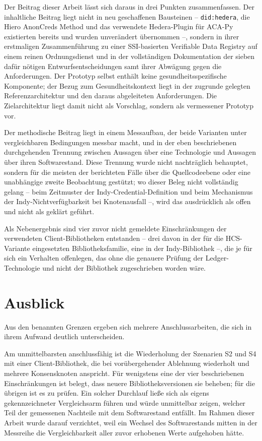Der Beitrag dieser Arbeit lässt sich daraus in drei Punkten zusammenfassen. Der inhaltliche Beitrag liegt nicht in neu geschaffenen Bausteinen -- \texttt{did:hedera}, die Hiero AnonCreds Method und das verwendete Hedera-Plugin für ACA-Py existierten bereits und wurden unverändert übernommen --, sondern in ihrer erstmaligen Zusammenführung zu einer SSI-basierten Verifiable Data Registry auf einem reinen Ordnungsdienst und in der vollständigen Dokumentation der sieben dafür nötigen Entwurfsentscheidungen samt ihrer Abwägung gegen die Anforderungen. Der Prototyp selbst enthält keine gesundheitsspezifische Komponente; der Bezug zum Gesundheitskontext liegt in der zugrunde gelegten Referenzarchitektur und den daraus abgeleiteten Anforderungen. Die Zielarchitektur liegt damit nicht als Vorschlag, sondern als vermessener Prototyp vor.

Der methodische Beitrag liegt in einem Messaufbau, der beide Varianten unter vergleichbaren Bedingungen messbar macht, und in der eben beschriebenen durchgehenden Trennung zwischen Aussagen über eine Technologie und Aussagen über ihren Softwarestand. Diese Trennung wurde nicht nachträglich behauptet, sondern für die meisten der berichteten Fälle über die Quellcodeebene oder eine unabhängige zweite Beobachtung gestützt; wo dieser Beleg nicht vollständig gelang -- beim Zeitmuster der Indy-Credential-Definition und beim Mechanismus der Indy-Nichtverfügbarkeit bei Knotenausfall --, wird das ausdrücklich als offen und nicht als geklärt geführt.

Als Nebenergebnis sind vier zuvor nicht gemeldete Einschränkungen der verwendeten Client-Bibliotheken entstanden -- drei davon in der für die HCS-Variante eingesetzten Bibliotheksfamilie, eine in der Indy-Bibliothek --, die je für sich ein Verhalten offenlegen, das ohne die genauere Prüfung der Ledger-Technologie und nicht der Bibliothek zugeschrieben worden wäre.

\section{Ausblick}
\label{sec:conclusion-ausblick}

Aus den benannten Grenzen ergeben sich mehrere Anschlussarbeiten, die sich in ihrem Aufwand deutlich unterscheiden.

Am unmittelbarsten anschlussfähig ist die Wiederholung der Szenarien S2 und S4 mit einer Client-Bibliothek, die bei vorübergehender Ablehnung wiederholt und mehrere Konsensknoten anspricht. Für wenigstens eine der vier beschriebenen Einschränkungen ist belegt, dass neuere Bibliotheksversionen sie beheben; für die übrigen ist es zu prüfen. Ein solcher Durchlauf ließe sich als eigens gekennzeichneter Vergleichsarm führen und würde unmittelbar zeigen, welcher Teil der gemessenen Nachteile mit dem Softwarestand entfällt. Im Rahmen dieser Arbeit wurde darauf verzichtet, weil ein Wechsel des Softwarestands mitten in der Messreihe die Vergleichbarkeit aller zuvor erhobenen Werte aufgehoben hätte.

